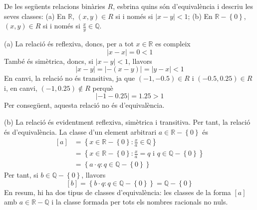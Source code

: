 \begin{exercici}
De les següents relacions binàries $R$, esbrina quins són
d'equivalència i descriu les seves classes: (a) En $\mathbb{R}$, $\left(
x,y\right) \in R$ si i només si $\left\vert x-y\right\vert <1$; (b) En $%
\mathbb{R}-\left\{ 0\right\} $, $\left( x,y\right) \in R$ si i només si $%
\frac{x}{y}\in \mathbb{Q}$.
\end{exercici}

\begin{solucio}
(a) La relació és reflexiva, doncs, per a tot $x\in \mathbb{R}$ es
compleix%
\begin{equation*}
\left\vert x-x\right\vert =0<1
\end{equation*}%
També és simètrica, doncs, si $\left\vert x-y\right\vert <1$,
llavors%
\begin{equation*}
\left\vert x-y\right\vert =\left\vert -\left( x-y\right) \right\vert
=\left\vert y-x\right\vert <1
\end{equation*}%
En canvi, la relació no és transitiva, ja que $\left( -1,-0.5\right)
\in R$ i $\left( -0.5,0.25\right) \in R$ i, en canvi, $\left( -1,0.25\right)
\notin R$ perquè%
\begin{equation*}
\left\vert -1-0.25\right\vert =1.25>1
\end{equation*}%
Per consegüent, aquesta relació no és d'equivalència.

(b) La relació és evidentment reflexiva, simètrica i transitiva.
Per tant, la relació és d'equivalència. La classe d'un element
arbitrari $a\in \mathbb{R}-\left\{ 0\right\} $ és%
\begin{align*}
\left[ a\right] & =\left\{ x\in \mathbb{R}-\left\{ 0\right\} :\frac{x}{a}\in
\mathbb{Q}\right\} \\
& =\left\{ x\in \mathbb{R}-\left\{ 0\right\} :\frac{x}{a}=q\text{ \ i \ }%
q\in \mathbb{Q}-\left\{ 0\right\} \right\} \\
& =\left\{ a\cdot q:q\in \mathbb{Q}-\left\{ 0\right\} \right\}
\end{align*}%
Per tant, si $b\in \mathbb{Q}-\left\{ 0\right\} $, llavors%
\begin{equation*}
\left[ b\right] =\left\{ b\cdot q:q\in \mathbb{Q}-\left\{ 0\right\} \right\}
=\mathbb{Q}-\left\{ 0\right\}
\end{equation*}%
En resum, hi ha dos tipus de classes d'equivalència: les classes de la
forma $\left[ a\right] $ amb $a\in \mathbb{R}-\mathbb{Q}$ i la classe
formada per tots els nombres racionals no nuls.
\end{solucio}

